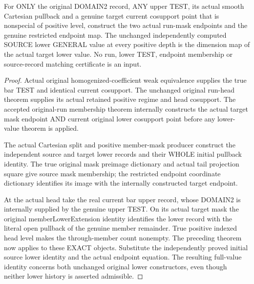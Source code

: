 \begin{theorem}
\label{hir:original-positive-run-independent-lower-smooth-values}
\leanok
For ONLY the original DOMAIN2 record, ANY upper TEST, its actual smooth
Cartesian pullback and a genuine target current cosupport point that
is nonspecial of positive level, construct the two actual run-mask
endpoints and the genuine restricted endpoint map. The unchanged
independently computed SOURCE lower GENERAL value at every positive
depth is the dimension map of the actual target lower value. No run,
lower TEST, endpoint membership or source-record matching certificate
is an input.
\end{theorem}
\begin{proof}
Actual original homogenized-coefficient weak equivalence supplies the
true bar TEST and identical current cosupport. The unchanged original
run-head theorem supplies its actual retained positive regime and head
cosupport. The accepted original-run membership theorem internally
constructs the actual target mask endpoint AND current original lower
cosupport point before any lower-value theorem is applied.

The actual Cartesian split and positive member-mask producer construct
the independent source and target lower records and their WHOLE
initial pullback identity. The true original mask preimage dictionary
and actual tail projection square give source mask membership; the
restricted endpoint coordinate dictionary identifies its image with
the internally constructed target endpoint.

At the actual head take the real current bar upper record, whose
DOMAIN2 is internally supplied by the genuine upper TEST. On its
actual target mask the original memberLowerExtension identity identifies
the lower record with the literal open pullback of the genuine member
remainder. True positive indexed head level makes the through-member
count nonempty. The preceding theorem now applies to these EXACT
objects. Substitute the independently proved initial source lower
identity and the actual endpoint equation. The resulting full-value
identity concerns both unchanged original lower constructors, even
though neither lower history is asserted admissible.
\end{proof}

